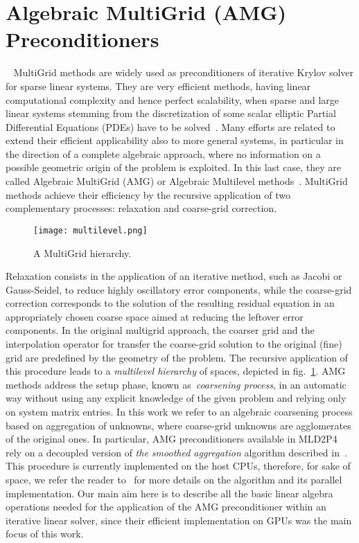 \section{Algebraic MultiGrid (AMG) Preconditioners}~\label{AMG}
%
MultiGrid methods are widely used as preconditioners of iterative
Krylov solver for sparse linear systems. 
They are very efficient methods, having linear computational
complexity and hence perfect scalability, when 
sparse and large linear systems stemming
from the discretization of some scalar elliptic Partial Differential
Equations (PDEs) have to be solved~\cite{Vassilevski2008}. 
Many efforts are related to extend their efficient applicability also
to more general systems, in particular in the direction of a complete
algebraic approach, where no information on a possible geometric
origin of the problem is exploited. In this last case, they are called
Algebraic MultiGrid (AMG) or Algebraic Multilevel
methods~\cite{Stuben2001}. 
MultiGrid methods achieve  their efficiency by the recursive application
of two complementary processes: {relaxation and coarse-grid
  correction}. 
\begin{figure}[t]
\begin{center}
\texttt{[image: multilevel.png]}
\caption{A MultiGrid hierarchy.\label{hierarchy}}
\end{center}
\end{figure}

Relaxation consists in the application of an iterative method, such as
Jacobi or Gauss-Seidel, to reduce highly oscillatory error components,
while the coarse-grid correction corresponds to the solution of the
resulting residual equation in an appropriately chosen coarse space
aimed at reducing the leftover error components. In the original
multigrid approach, the coarser grid and the interpolation operator
for transfer the coarse-grid solution to the original (fine) grid are
predefined by the geometry of the problem. The recursive application
of this procedure leads to a \emph{multilevel hierarchy} of spaces,
depicted in fig.~\ref{hierarchy}. AMG
methods address the setup phase, known as~\emph{coarsening process},
in an automatic way without using any explicit knowledge of the given
problem and relying only on system matrix entries. In this work we
refer to an algebraic coarsening process based on aggregation of
unknowns, where coarse-grid unknowns are agglomerates of the original
ones. In particular, AMG preconditioners available in MLD2P4 rely
on a decoupled version of \emph{the smoothed aggregation} algorithm
described in~\cite{BrezinaVanek96,BrezinaVanek99}. This procedure is
currently implemented on the host CPUs, therefore, for sake of space,
we refer the reader to~\cite{mld2p4-2-guide} for more details on the
algorithm and its parallel implementation. 
Our main aim here is to describe all the basic linear algebra
operations needed for the application of the AMG preconditioner within
an iterative  linear solver, since their efficient implementation on
GPUs was the main focus of this work. 

